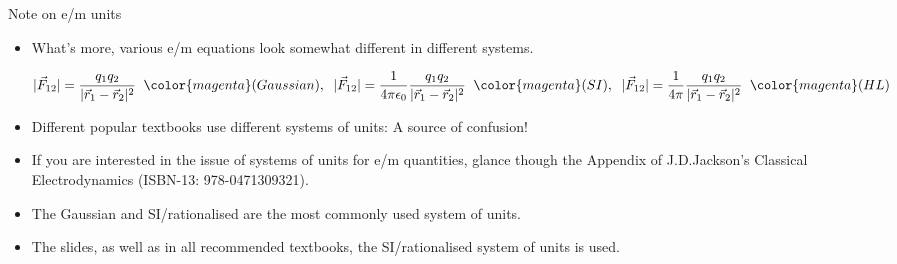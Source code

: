 \begin{frame}{Note on e/m units}

\begin{itemize}
\item
 What's more, various e/m equations look somewhat different in different systems.

 {\scriptsize
   \begin{equation*}
     |\vec{F}_{12}| = \frac{q_1 q_2}{|\vec{r}_{1}-\vec{r}_{2}|^{2}} \;\; {\color{magenta}(Gaussian)},  \;\;
     |\vec{F}_{12}| = \frac{1}{4 \pi \epsilon_0} \frac{q_1 q_2}{|\vec{r}_{1}-\vec{r}_{2}|^{2}} \;\; {\color{magenta}(SI)},  \;\;
     |\vec{F}_{12}| = \frac{1}{4 \pi} \frac{q_1 q_2}{|\vec{r}_{1}-\vec{r}_{2}|^{2}} \;\; {\color{magenta}(HL)}
   \end{equation*}
 }

\item
  Different popular textbooks use different systems of units: A source of confusion!

\item
  If you are interested in the issue of systems of units for e/m quantities, glance though the Appendix of J.D.Jackson's Classical Electrodynamics (ISBN-13: 978-0471309321).

\item
 The Gaussian and SI/rationalised are the most commonly used system of units.

\item
 The slides, as well as in all recommended textbooks, the SI/rationalised system of units is used.

\end{itemize}

\end{frame}

%
%

